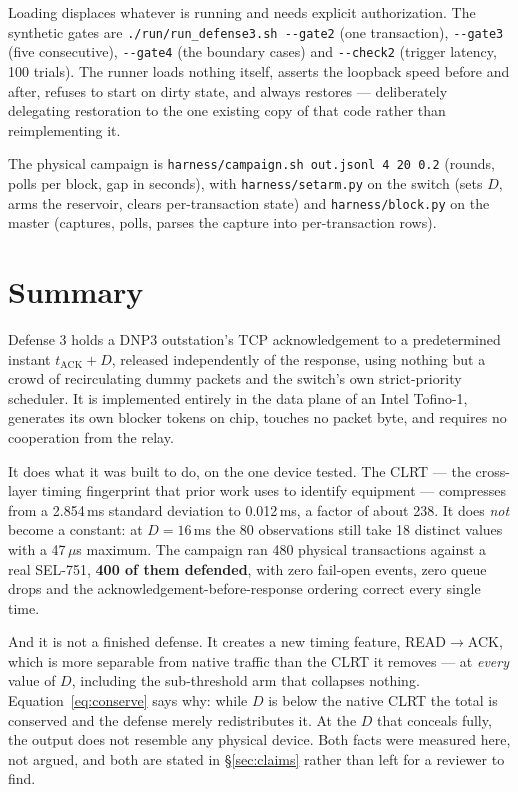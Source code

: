 \documentclass[10pt,a4paper,oneside]{article}
\newcommand{\num}[1]{\mbox{#1}}
\newcommand{\code}[1]{\texttt{\small #1}}
\begin{document}
Loading displaces whatever is running and needs explicit authorization. The synthetic gates
are \code{./run/run\_defense3.sh -{}-gate2} (one transaction), \code{-{}-gate3} (five
consecutive), \code{-{}-gate4} (the boundary cases) and \code{-{}-check2} (trigger latency,
100 trials). The runner loads nothing itself, asserts the loopback speed before and after,
refuses to start on dirty state, and always restores --- deliberately delegating restoration
to the one existing copy of that code rather than reimplementing it.

The physical campaign is \code{harness/campaign.sh out.jsonl 4 20 0.2} (rounds, polls per
block, gap in seconds), with \code{harness/setarm.py} on the switch (sets $D$, arms the
reservoir, clears per-transaction state) and \code{harness/block.py} on the master
(captures, polls, parses the capture into per-transaction rows).

\section{Summary}

Defense 3 holds a DNP3 outstation's TCP acknowledgement to a predetermined instant
$t_{\mathrm{ACK}}+D$, released independently of the response, using nothing but a crowd of
recirculating dummy packets and the switch's own strict-priority scheduler. It is
implemented entirely in the data plane of an Intel Tofino-1, generates its own blocker
tokens on chip, touches no packet byte, and requires no cooperation from the relay.

It does what it was built to do, on the one device tested. The CLRT --- the cross-layer
timing fingerprint that prior work uses to identify equipment --- compresses from a
\num{2.854}\,ms standard deviation to \num{0.012}\,ms, a factor of about 238. It does
\emph{not} become a constant: at $D=16$\,ms the 80 observations still take 18 distinct values
with a \num{47}\,$\mu$s maximum. The campaign ran 480 physical transactions against a real
SEL-751, \textbf{400 of them defended}, with zero fail-open events, zero queue drops and the
acknowledgement-before-response ordering correct every single time.

And it is not a finished defense. It creates a new timing feature, READ$\to$ACK, which is
more separable from native traffic than the CLRT it removes --- at \emph{every} value of
$D$, including the sub-threshold arm that collapses nothing. Equation~\eqref{eq:conserve} says why:
while $D$ is below the native CLRT the total is conserved and the defense merely
redistributes it. At the $D$ that conceals fully, the output does not resemble any physical
device. Both facts were measured here, not argued, and both are stated in
\S\ref{sec:claims} rather than left for a reviewer to find.
\end{document}
